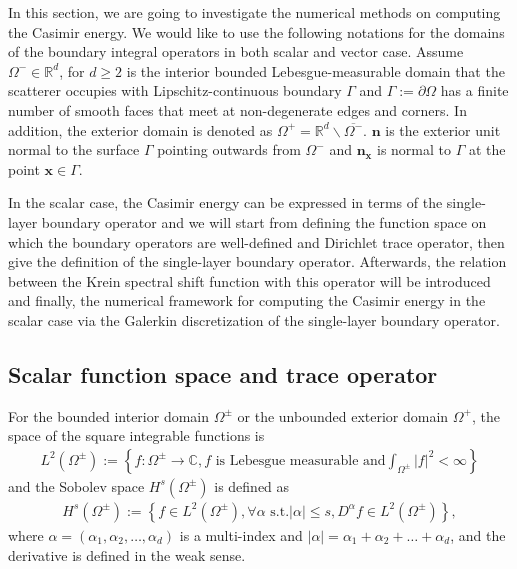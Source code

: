 In this section, we are going to investigate the numerical methods on computing the Casimir energy. 
We would like to use the following notations for the domains of the boundary integral operators in both scalar and vector case. Assume 
$\Omega^{-}\in\mathbb{R}^{d}$, for $d \geq 2$ is the interior bounded Lebesgue-measurable domain that the scatterer occupies with Lipschitz-continuous boundary $\Gamma$ and 
$\Gamma:=\partial\Omega$ has a finite number of smooth faces that meet at non-degenerate edges and corners. In addition, the exterior domain is denoted as 
$\Omega^{+} = \mathbb{R}^{d}\backslash\overline{\Omega^{-}}$. $\boldsymbol{n}$ is the exterior unit normal to the surface $\Gamma$ pointing outwards from $\Omega^{-}$ and 
$\boldsymbol{n}_{\boldsymbol{x}}$ is normal to $\Gamma$ at the point $\boldsymbol{x}\in\Gamma$.

In the scalar case, the Casimir energy can be expressed in terms of the single-layer boundary operator and we will start from defining the function space 
on which the boundary operators are well-defined and Dirichlet trace operator, then give the definition of the single-layer boundary operator. Afterwards, the relation between the Krein 
spectral shift function with this operator will be introduced and finally, the numerical framework for computing the Casimir energy in the scalar case 
via the Galerkin discretization of the single-layer boundary operator.
\subsection{Scalar function space and trace operator}
For the bounded interior domain $\Omega^{\pm}$ or the unbounded exterior domain $\Omega^{+}$, the space of the square integrable functions is 
\begin{align*}
    L^{2}(\Omega^{\pm}) := \left\{f:\Omega^{\pm}\rightarrow\mathbb{C}, f \text{ is Lebesgue measurable and} \int_{\Omega^{\pm}}|f|^{2} < \infty \right\}
\end{align*}
and the Sobolev space $H^{s}(\Omega^{\pm})$ is defined as 
\begin{align*}
    H^{s}(\Omega^{\pm}):=\left\{f\in L^{2}(\Omega^{\pm}), \forall\alpha \text{ s.t.} |\alpha|\leq s, D^{\alpha}f\in L^{2}(\Omega^{\pm})\right\},
\end{align*}
where $\alpha = (\alpha_{1}, \alpha_{2}, \dots, \alpha_{d})$ is a multi-index and $|\alpha| = \alpha_{1} + \alpha_{2} + \dots + \alpha_{d}$, and 
the derivative is defined in the weak sense.

